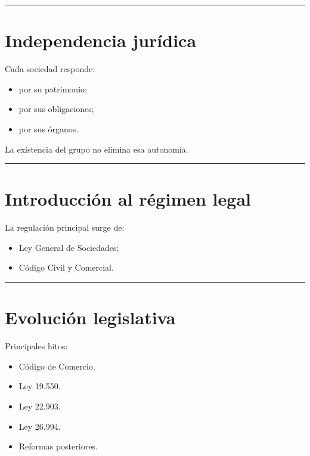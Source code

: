 \documentclass[
  spanish,
  letterpaper,
  DIV=11,
  numbers=noendperiod]{scrartcl}
\providecommand{\tightlist}{%
  \setlength{\itemsep}{0pt}\setlength{\parskip}{0pt}}
\begin{document}
\begin{center}\rule{0.5\linewidth}{0.5pt}\end{center}

\section{Independencia jurídica}\label{independencia-juruxeddica}

Cada sociedad responde:

\begin{itemize}
\tightlist
\item
  por su patrimonio;
\item
  por sus obligaciones;
\item
  por sus órganos.
\end{itemize}

La existencia del grupo no elimina esa autonomía.

\begin{center}\rule{0.5\linewidth}{0.5pt}\end{center}

\section{Introducción al régimen
legal}\label{introducciuxf3n-al-ruxe9gimen-legal}

La regulación principal surge de:

\begin{itemize}
\tightlist
\item
  Ley General de Sociedades;
\item
  Código Civil y Comercial.
\end{itemize}

\begin{center}\rule{0.5\linewidth}{0.5pt}\end{center}

\section{Evolución legislativa}\label{evoluciuxf3n-legislativa}

Principales hitos:

\begin{itemize}
\tightlist
\item
  Código de Comercio.
\item
  Ley 19.550.
\item
  Ley 22.903.
\item
  Ley 26.994.
\item
  Reformas posteriores.
\end{itemize}
\end{document}
